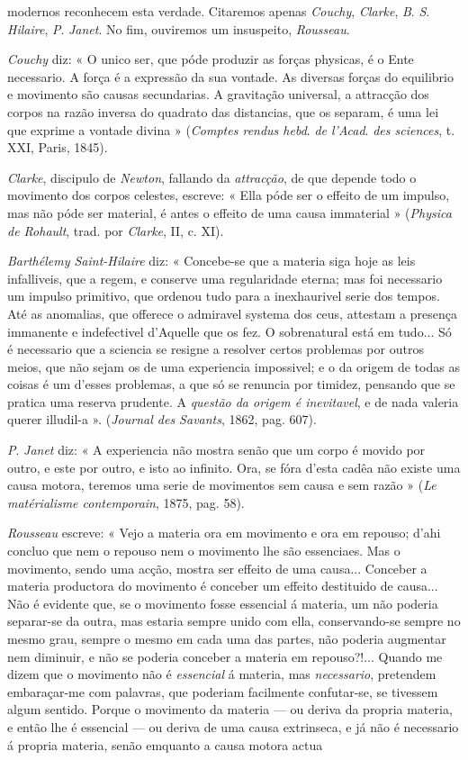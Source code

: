 modernos reconhecem esta verdade. Citaremos apenas \emph{Couchy}, \emph{Clarke}, \emph{B}. \emph{S}. \emph{Hilaire}, \emph{P}. \emph{Janet}. No fim, ouviremos um insuspeito, \emph{Rousseau}.\par \emph{Couchy} diz: « O unico ser, que póde produzir as forças physicas, é o Ente necessario. A força é a expressão da sua vontade. As diversas forças do equilibrio e movimento são causas secundarias. A gravitação universal, a attracção dos corpos na razão inversa do quadrato das distancias, que os separam, é uma lei que exprime a vontade divina » (\emph{Comptes rendus hebd}. \emph{de l'Acad}. \emph{des sciences}, t. XXI, Paris, 1845).\par \emph{Clarke}, discipulo de \emph{Newton}, fallando da \emph{attracção}, de que depende todo o movimento dos corpos celestes, escreve: « Ella póde ser o effeito de um impulso, mas não póde ser material, é antes o effeito de uma causa immaterial » (\emph{Physica de Rohault}, trad. por \emph{Clarke}, II, c. XI).\par \emph{Barthélemy Saint-Hilaire} diz: « Concebe-se que a materia siga hoje as leis infalliveis, que a regem, e conserve uma regularidade eterna; mas foi necessario um impulso primitivo, que ordenou tudo para a inexhaurivel serie dos tempos. Até as anomalias, que offerece o admiravel systema dos ceus, attestam a presença immanente e indefectivel d'Aquelle que os fez. O sobrenatural está em tudo... Só é necessario que a sciencia se resigne a resolver certos problemas por outros meios, que não sejam os de uma experiencia impossivel; e o da origem de todas as coisas é um d'esses problemas, a que só se renuncia por timidez, pensando que se pratica uma reserva prudente. A \emph{questão da origem é inevitavel}, e de nada valeria querer illudil-a ». (\emph{Journal des Savants}, 1862, pag. 607).\par \emph{P}. \emph{Janet} diz: « A experiencia não mostra senão que um corpo é movido por outro, e este por outro, e isto ao infinito. Ora, se fóra d'esta cadêa não existe uma causa motora, teremos uma serie de movimentos sem causa e sem razão » (\emph{Le matérialisme contemporain}, 1875, pag. 58).\par \emph{Rousseau} escreve: « Vejo a materia ora em movimento e ora em repouso; d'ahi concluo que nem o repouso nem o movimento lhe são essenciaes. Mas o movimento, sendo uma acção, mostra ser effeito de uma causa... Conceber a materia productora do movimento é conceber um effeito destituido de causa... Não é evidente que, se o movimento fosse essencial á materia, um não poderia separar-se da outra, mas estaria sempre unido com ella, conservando-se sempre no mesmo grau, sempre o mesmo em cada uma das partes, não poderia augmentar nem diminuir, e não se poderia conceber a materia em repouso?!... Quando me dizem que o movimento não é \emph{essencial} á materia, mas \emph{necessario}, pretendem embaraçar-me com palavras, que poderiam facilmente confutar-se, se tivessem algum sentido. Porque o movimento da materia --- ou deriva da propria materia, e então lhe é essencial --- ou deriva de uma causa extrinseca, e já não é necessario á propria materia, senão emquanto a causa motora actua 